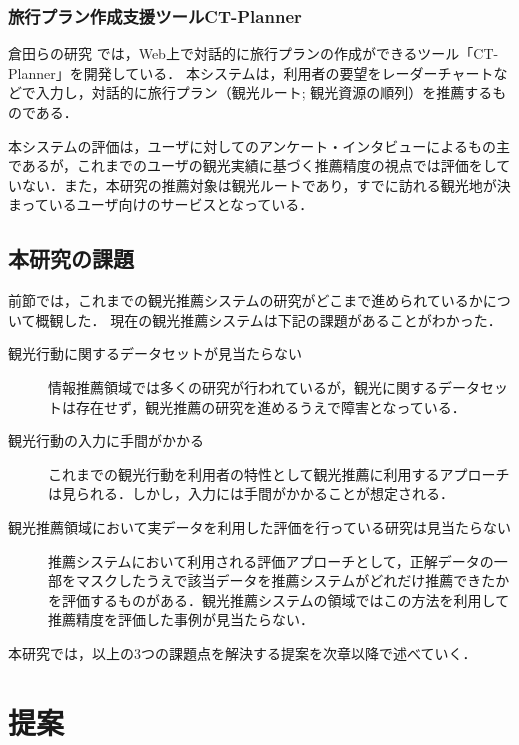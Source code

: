 \documentclass{jsarticle}
\begin{document}
\subsubsection{旅行プラン作成支援ツールCT-Planner}

倉田らの研究\cite{ctplanner}\cite{ctplanner2}\cite{ctplanner3}\cite{ctplanner3b}\cite{ctplanner4}\cite{ctplanner5} では，Web上で対話的に旅行プランの作成ができるツール「CT-Planner\cite{ctplanner_web}」を開発している．
本システムは，利用者の要望をレーダーチャートなどで入力し，対話的に旅行プラン（観光ルート; 観光資源の順列）を推薦するものである．

本システムの評価は，ユーザに対してのアンケート・インタビューによるもの主であるが，これまでのユーザの観光実績に基づく推薦精度の視点では評価をしていない．また，本研究の推薦対象は観光ルートであり，すでに訪れる観光地が決まっているユーザ向けのサービスとなっている．

\subsection{本研究の課題}

前節では，これまでの観光推薦システムの研究がどこまで進められているかについて概観した．
現在の観光推薦システムは下記の課題があることがわかった．

\begin{description}
\item[観光行動に関するデータセットが見当たらない]
       情報推薦領域では多くの研究が行われているが，観光に関するデータセットは存在せず，観光推薦の研究を進めるうえで障害となっている．
\item[観光行動の入力に手間がかかる]
       これまでの観光行動を利用者の特性として観光推薦に利用するアプローチは見られる．しかし，入力には手間がかかることが想定される．
\item[観光推薦領域において実データを利用した評価を行っている研究は見当たらない]
       推薦システムにおいて利用される評価アプローチとして，正解データの一部をマスクしたうえで該当データを推薦システムがどれだけ推薦できたかを評価するものがある．観光推薦システムの領域ではこの方法を利用して推薦精度を評価した事例が見当たらない．
\end{description}

本研究では，以上の3つの課題点を解決する提案を次章以降で述べていく．

\section{提案}
\end{document}
